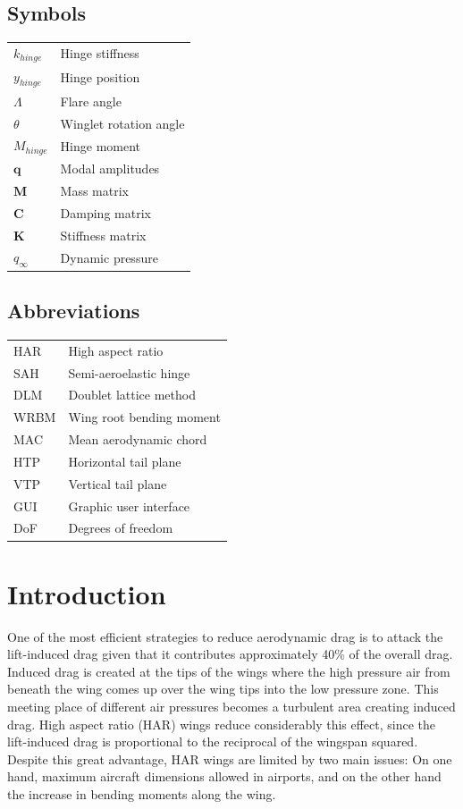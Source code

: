 \documentclass[conference]{IEEEtran}
\begin{document}
\subsection*{Symbols}
\begin{tabular}{l l}
$k_{hinge}$&    Hinge stiffness\\
$y_{hinge}$&    Hinge position\\
$\Lambda$&      Flare angle\\
$\theta$ &      Winglet rotation angle\\
$M_{hinge}$&    Hinge moment\\
$\textbf{q}$&   Modal amplitudes\\
$\textbf{M}$&   Mass matrix\\
$\textbf{C}$&   Damping matrix\\
$\textbf{K}$&   Stiffness matrix\\
$q_{\infty}$&   Dynamic pressure\\
\end{tabular}

\subsection*{Abbreviations}

\begin{tabular}{l l}
HAR&    High aspect ratio\\
SAH&    Semi-aeroelastic hinge\\
DLM&    Doublet lattice method\\
WRBM&   Wing root bending moment\\
MAC&    Mean aerodynamic chord\\
HTP&    Horizontal tail plane\\
VTP&    Vertical tail plane\\
GUI&    Graphic user interface\\
DoF&    Degrees of freedom\\
\end{tabular}



\section{Introduction}
\label{sec:problem-statement}

One of the most efficient strategies to reduce aerodynamic drag is to attack the lift-induced drag given that it contributes approximately 40\% of the overall drag. Induced drag is created at the tips of the wings where the high pressure air from beneath the wing comes up over the wing tips into the low pressure zone. This meeting place of different air pressures becomes a turbulent area creating induced drag. High aspect ratio (HAR) wings reduce considerably this effect, since the lift-induced drag is proportional to the reciprocal of the wingspan squared. Despite this great advantage, HAR wings are limited by two main issues: On one hand, maximum aircraft dimensions allowed in airports, and on the other hand the increase in bending moments along the wing.
\end{document}
